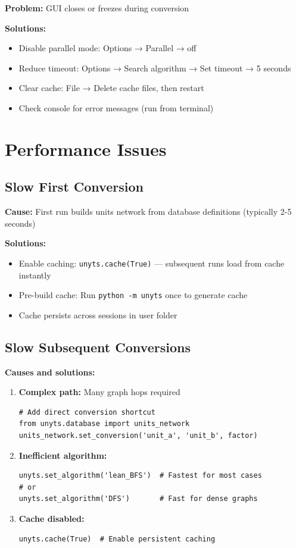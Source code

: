 \documentclass[11pt,a4paper]{report}
\begin{document}
\textbf{Problem:} GUI closes or freezes during conversion

\textbf{Solutions:}
\begin{itemize}
\item Disable parallel mode: Options → Parallel → off
\item Reduce timeout: Options → Search algorithm → Set timeout → 5 seconds
\item Clear cache: File → Delete cache files, then restart
\item Check console for error messages (run from terminal)
\end{itemize}

\section{Performance Issues}

\subsection{Slow First Conversion}

\textbf{Cause:} First run builds units network from database definitions (typically 2-5 seconds)

\textbf{Solutions:}
\begin{itemize}
\item Enable caching: \texttt{unyts.cache(True)} — subsequent runs load from cache instantly
\item Pre-build cache: Run \texttt{python -m unyts} once to generate cache
\item Cache persists across sessions in user folder
\end{itemize}

\subsection{Slow Subsequent Conversions}

\textbf{Causes and solutions:}
\begin{enumerate}
\item \textbf{Complex path:} Many graph hops required
\begin{lstlisting}[style=pythonstyle]
# Add direct conversion shortcut
from unyts.database import units_network
units_network.set_conversion('unit_a', 'unit_b', factor)
\end{lstlisting}

\item \textbf{Inefficient algorithm:}
\begin{lstlisting}[style=pythonstyle]
unyts.set_algorithm('lean_BFS')  # Fastest for most cases
# or
unyts.set_algorithm('DFS')       # Fast for dense graphs
\end{lstlisting}

\item \textbf{Cache disabled:}
\begin{lstlisting}[style=pythonstyle]
unyts.cache(True)  # Enable persistent caching
\end{lstlisting}
\end{enumerate}
\end{document}
